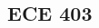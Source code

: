 \documentclass{formulae}
\begin{document}
\begin{multicols*}{2}

    \section{ECE 403}
    
    

\end{multicols*}
\end{document}
